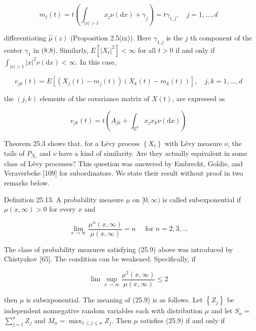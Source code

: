 \documentclass[a4paper,11pt]{article}
\begin{document}
\begin{equation*}
    m_{j}(t)=t\left(\int_{|x|>1} x_{j} \nu(\mathrm{d} x)+\gamma_{j}\right)=t \gamma_{1, j}, \quad j=1, \ldots, d \tag{25.7}
\end{equation*}

differentiating $\widehat{\mu}(z)$ (Proposition 2.5(ix)). Here $\gamma_{1, j}$ is the $j$ th
component of the center $\gamma_{1}$ in (8.8). Similarly, $E\left[\left|X_{t}\right|^{2}\right]<\infty$
for all $t>0$ if and only if $\int_{|x|>1}|x|^{2} \nu(\mathrm{d} x)<\infty$. In this case,

$$
    v_{j k}(t)=E\left[\left(X_{j}(t)-m_{j}(t)\right)\left(X_{k}(t)-m_{k}(t)\right)\right], \quad j, k=1, \ldots, d
$$

the $(j, k)$ elements of the covariance matrix of $X(t)$, are expressed as


\begin{equation*}
    v_{j k}(t)=t\left(A_{j k}+\int_{\mathbb{R}^{d}} x_{j} x_{k} \nu(\mathrm{d} x)\right) \tag{25:8}
\end{equation*}


Theorem 25.3 shows that, for a Lévy process $\left\{X_{t}\right\}$ with Lévy measure $\nu$,
the tails of $P_{X_{t}}$ and $\nu$ have a kind of similarity. Are they actually equivalent
in some class of Lévy processes? This question was answered by Embrecht, Goldie, and Veraverbeke [109]
for subordinators. We state their result without proof in two remarks below. \\


Definition 25.13. A probability measure $\mu$ on $[0, \infty)$ is called
subexponential if $\mu(x, \infty)>0$ for every $x$ and

\begin{equation*}
    \lim _{x \rightarrow \infty} \frac{\mu^{n}(x, \infty)}{\mu(x, \infty)}=n \quad \text { for } n=2,3, \ldots \tag{25.9}
\end{equation*}

The class of probability measures satisfying (25.9) above was introduced by Chistyakov [65].
The condition can be weakened. Specifically, if

$$
    \lim \sup _{x \rightarrow \infty} \frac{\mu^{2}(x, \infty)}{\mu(x, \infty)} \leq 2
$$

then $\mu$ is subexponential. The meaning of (25.9) is as follows. Let $\left\{Z_{j}\right\}$
be independent nonnegative random variables each with distribution $\mu$
and let $S_{n}=$ $\sum_{j=1}^{n} Z_{j}$ and $M_{n}=\max _{1 \leq j \leq n} Z_{j}$.
Then $\mu$ satisfies (25.9) if and only if
\end{document}
